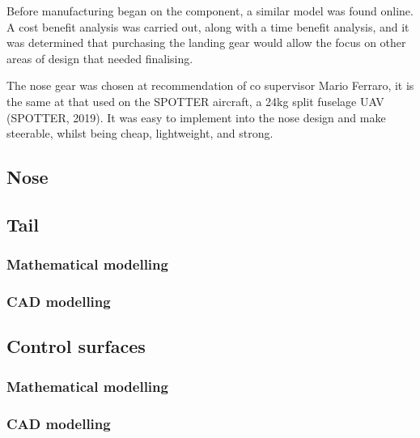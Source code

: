 \documentclass[../../main.tex]{subfiles}
\begin{document}
Before manufacturing began on the component, a similar model was found online. A cost benefit analysis was carried out, along with a time benefit analysis, and it was determined that purchasing the landing gear would allow the focus on other areas of design that needed finalising. 


The nose gear was chosen at recommendation of co supervisor Mario Ferraro, it is the same at that used on the SPOTTER aircraft, a 24kg split fuselage UAV (SPOTTER, 2019). It was easy to implement into the nose design and make steerable, whilst being cheap, lightweight, and strong. 

\subsection{Nose} \label{sec:design-process:final-design-proposal:nose}

\subsection{Tail} \label{sec:design-process:final-design-proposal:tail}

\subsubsection{Mathematical modelling} \label{sec:design-process:final-design-proposal:tail:mathematical-modelling}

\subsubsection{CAD modelling} \label{sec:design-process:final-design-proposal:tail:cad-modelling}

\subsection{Control surfaces} \label{sec:design-process:final-design-proposal:control-surfaces}

\subsubsection{Mathematical modelling} \label{sec:design-process:final-design-proposal:control-surfaces:mathematical-modelling}

\subsubsection{CAD modelling} \label{sec:design-process:final-design-proposal:control-surfaces:cad-modelling}
\end{document}
